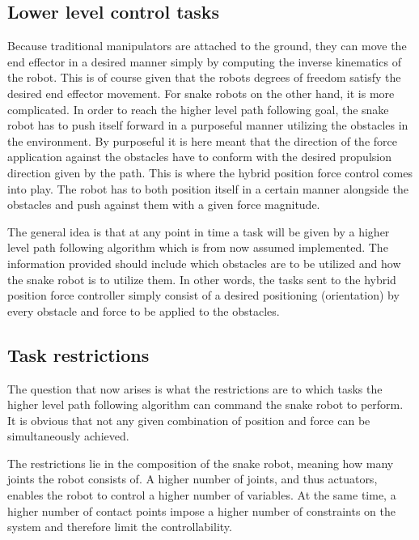 \subsection{Lower level control tasks}

Because traditional manipulators are attached to the ground, they can move the end effector in a desired manner simply by computing the inverse kinematics of the robot. This is of course given that the robots degrees of freedom satisfy the desired end effector movement. For snake robots on the other hand, it is more complicated.
In order to reach the higher level path following goal, the snake robot has to push itself forward in a purposeful manner utilizing the obstacles in the environment. By purposeful it is here meant that the direction of the force application against the obstacles have to conform with the desired propulsion direction given by the path. This is where the hybrid position force control comes into play. The robot has to both position itself in a certain manner alongside the obstacles and push against them with a given force magnitude.

The general idea is that at any point in time a task will be given by a higher level path following algorithm which is from now assumed implemented. The information provided should include which obstacles are to be utilized and how the snake robot is to utilize them. In other words, the tasks sent to the hybrid position force controller simply consist of a desired positioning (orientation) by every obstacle and force to be applied to the obstacles.



\subsection{Task restrictions}\label{subsec:task-restrictions}

The question that now arises is what the restrictions are to which tasks the higher level path following algorithm can command the snake robot to perform. It is obvious that not any given combination of position and force can be simultaneously achieved.

The restrictions lie in the composition of the snake robot, meaning how many joints the robot consists of. A higher number of joints, and thus actuators, enables the robot to control a higher number of variables. At the same time, a higher number of contact points impose a higher number of constraints on the system and therefore limit the controllability.

